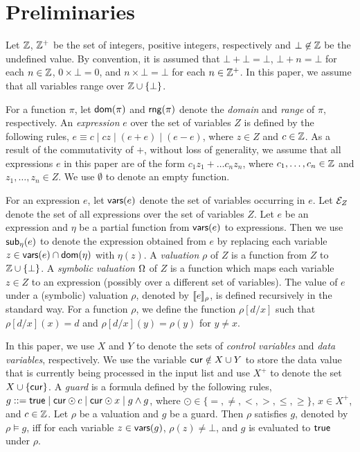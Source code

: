 
\section{Preliminaries}
\label{sec:preliminaries}
Let ${\mathbb{Z} }$,  ${\mathbb{Z} }^+$ be the set of integers, positive integers, respectively and $\bot \not \in {\mathbb{Z} }$ be  the undefined value. By convention, it is assumed that $\bot + \bot = \bot$, $\bot + n = \bot$ for each $n \in {\mathbb{Z} }$, $0 \times \bot = 0$, and $n \times \bot = \bot$ for each $n \in {\mathbb{Z} }^+$.
In this paper, we assume that all variables range over ${\mathbb{Z} } \cup \{\bot\}$.  

For a function $\pi$, let $\mathsf{dom}(\pi)$ and $\mathsf{rng}(\pi)$ denote the \emph{domain}  and \emph{range} of $\pi$, respectively. 
An \emph{expression} $e$ over the set of variables $Z$ is defined by the following rules, $e\equiv  c \mid  c z \mid (e + e) \mid (e - e)$, where $z \in Z$ and $c\in {\mathbb{Z} }$.  As a result of the commutativity of $+$, without loss of generality, we assume that all expressions $e$ in this paper are of the form $c_1 z_1 + \dots c_n z_n$, where $c_1,\dots,c_n \in {\mathbb{Z} }$ and $z_1,\dots,z_n \in Z$. We use $\emptyset$ to denote an empty function.


For an expression $e$, let $\mathsf{vars}(e)$ denote the set of variables occurring in $e$. Let ${\mathcal{E} }_Z$ denote the set of all expressions over the set of variables $Z$. Let $e$ be an expression and $\eta$ be a partial function from $\mathsf{vars}(e)$ to expressions. Then we use $\mathsf{sub}_{\eta}(e)$ to denote the expression obtained from $e$ by replacing each variable $z \in \mathsf{vars}(e)\cap\mathsf{dom}(\eta)$ with $\eta(z)$. A \emph{valuation} $\rho$ of $Z$ is a function from $Z$ to ${\mathbb{Z} }\cup\{\bot\}$. A \emph{symbolic valuation} $\Omega$ of $Z$ is a function which maps each variable $z \in Z$ to an expression (possibly over a different set of variables). The value of $e$ under a (symbolic) valuation $\rho$, denoted by $\llbracket e\rrbracket_{\rho}$, is defined recursively in the standard way.
For a function $\rho$, we define the function $\rho[d/x]$ such that $\rho[d/x](x)=d$ and $\rho[d/x](y)=\rho(y)$ for $y\neq x$. 

In this paper, we use $X$ and $Y$ to denote the sets of \emph{control variables} and \emph{data variables}, respectively. We use the variable $\mathsf{cur} \notin X\cup Y$ to store the data value that is currently being processed in the input list and use $X^+$ to denote the set $X\cup \{\mathsf{cur}\}$.
A \emph{guard} is a formula defined by the following rules, $g::= \mathsf{true} \mid \mathsf{cur}\odot c \mid \mathsf{cur}\odot x \mid g \wedge g$, where $\odot \in \{=,\neq,<, >, \le, \ge\}$, $x \in X^+$, and $c\in {\mathbb{Z} }$. 
Let $\rho$ be a valuation and $g$ be a guard. Then $\rho$ satisfies $g$, denoted by $\rho \models g$, iff for each variable $z \in \mathsf{vars}(g)$, $\rho(z) \neq \bot$, and $g$ is evaluated to $\mathsf{true}$ under $\rho$. 

